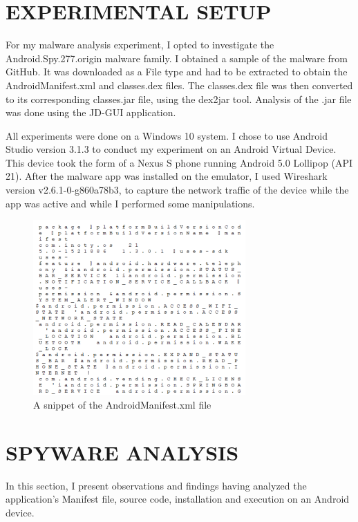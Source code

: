 \documentclass[conference]{IEEEtran}
\begin{document}
\section{EXPERIMENTAL SETUP}
For my malware analysis experiment, I opted to investigate the Android.Spy.277.origin malware family. I obtained a sample of the malware from GitHub. It was downloaded as a File type and had to be extracted to obtain the AndroidManifest.xml and classes.dex files. The classes.dex file was then converted to its corresponding classes.jar file, using the dex2jar tool. Analysis of the .jar file was done using the JD-GUI application.
\par All experiments were done on a Windows 10 system. I chose to use Android Studio version 3.1.3 to conduct my experiment on an Android Virtual Device. This device took the form of a Nexus S phone running Android 5.0 Lollipop (API 21). After the malware app was installed on the emulator, I used Wireshark version v2.6.1-0-g860a78b3, to capture the network traffic of the device while the app was active and while I performed some manipulations.
\begin{figure}
    \centering
    \includegraphics{fig1.png}
    \caption{A snippet of the AndroidManifest.xml file}
    \label{fig:my_label}
\end{figure}

\section{SPYWARE ANALYSIS}
In this section, I present observations and findings having analyzed the application’s Manifest file, source code, installation and execution on an Android device.
\end{document}
